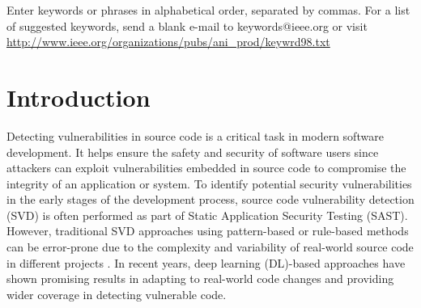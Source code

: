 \documentclass{ieeeaccess}
\begin{document}
\begin{keywords}
Enter keywords or phrases in alphabetical 
order, separated by commas. For a list of suggested keywords, send a blank 
e-mail to keywords@ieee.org or visit \underline
{http://www.ieee.org/organizations/pubs/ani\_prod/keywrd98.txt}
\end{keywords}

\titlepgskip=-15pt

\maketitle

\section{Introduction}\label{sec:I}
\par %
Detecting vulnerabilities in source code is a critical task in modern software development. It helps ensure the safety and security of software users since attackers can exploit vulnerabilities embedded in source code \cite{cwe22,cwe352,cwe601,cwe79,cwe94,CWE-77,CWE-89} to compromise the integrity of an application or system. To identify potential security vulnerabilities in the early stages of the development process, source code vulnerability detection (SVD) is often performed as part of Static Application Security Testing (SAST). However, traditional SVD approaches using pattern-based \cite{pattern_tool1, pattern_tool2, pattern_tool3, pattern_tool4, pattern_tool5, coverity} or rule-based \cite{rule_tool1, rule_tool2, rule_tool3, rule_tool4, rule_tool5, rule_tool6, coverity} methods can be error-prone due to the complexity and variability of real-world source code in different projects \cite{sast_tools_study}. In recent years, deep learning (DL)-based approaches \cite{Linevd, MVD, vuldeekeeper, SySeVR, VulDeeLocator, DeepWukong, VUDENC, func_level_1, func_level_2, func_level_4, devign, Are, vuldeepeeker2} have shown promising results in adapting to real-world code changes and providing wider coverage in detecting vulnerable code.

 
\end{document}
